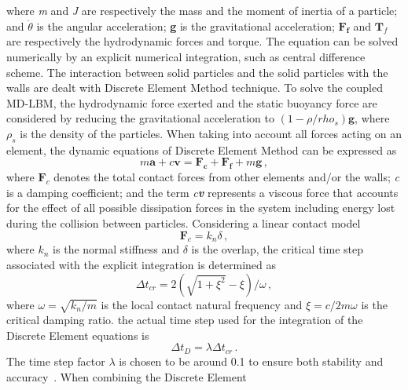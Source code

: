 %
\noindent where \textit{m} and \textit{J} are respectively the mass and the 
moment of inertia of a particle; and $\ddot{\theta}$ is the angular 
acceleration; \textbf{g} is the gravitational acceleration; $\mathbf{F_f}$ and 
$\mathbf{T}_{f}$ are respectively the hydrodynamic forces and torque. The 
equation can be solved numerically by an explicit numerical integration, such 
as central difference scheme. The interaction between solid particles and the 
solid particles with the walls are dealt with Discrete Element Method 
technique. To solve the coupled MD-LBM, the hydrodynamic force exerted and the 
static buoyancy force are considered by reducing the gravitational acceleration 
to $(1- \rho/rho_{s})\mathbf{g}$, where $\rho_{s}$ is the density of the 
particles. When taking into account all forces acting on an element, the 
dynamic equations of Discrete Element Method can be expressed as
%
\begin{equation}
\label{eq:mde}
\mathit{m}\mathbf{a} +\mathit{c}\mathbf{v} = \mathbf{F_c} + \mathbf{F_f} 
+\mathit{m}\mathbf{g} \,,
\end{equation} 
%
\noindent where $\mathbf{F}_{c}$ denotes the total contact forces from other 
elements and/or the walls; \textit{c} is a damping coefficient; and the term 
\textit{c\textbf{v}} represents a viscous force that accounts for the effect of 
all possible dissipation forces in the system including energy lost during the 
collision between particles. Considering a linear contact model
%
\begin{equation}
\mathbf{F}_{c}=\mathit{k}_{\mathit{n}} \delta \,,
\end{equation}
%
\noindent where $\mathit{k}_{\mathit{n}}$ is the normal stiffness and $\delta$ 
is the overlap, the critical time step associated with the explicit integration 
is determined as~\citep{He1997}
%
\begin{equation}
\Delta t_{\mathit{cr}}= 2(\sqrt{1 + \xi^{2}}-\xi) / \omega \,,
\end{equation}
%
\noindent where $\omega = \sqrt{\mathit{k}_{\mathit{n}}/\mathit{m}}$ is the 
local contact natural frequency and $\xi = \mathit{c}/2\mathit{m}\omega$ is the 
critical damping ratio. the actual time step used for the integration of the 
Discrete Element equations is
%
\begin{equation}
\Delta \mathit{t}_{D}=\lambda \Delta \mathit{t}_{cr} \,.
\end{equation}
%
The time step factor $\lambda$ is chosen to be around 0.1 to ensure both 
stability and accuracy~\citep{He1997}. When combining the Discrete Element 
